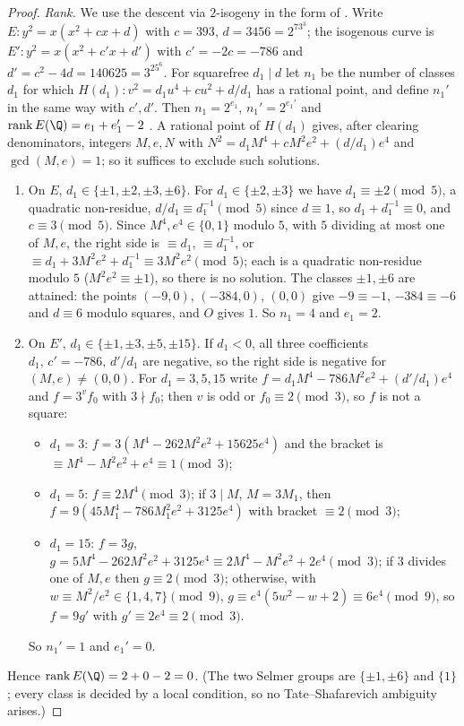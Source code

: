 \begin{proof}
\emph{Rank.} We use the descent via $2$-isogeny in the form of
\cite[\S3.6, Method~1 and (3.6.2)]{cremona1997}. Write $E:y^2=x(x^2+cx+d)$ with $c=393$,
$d=3456=2^73^3$; the isogenous curve is $E':y^2=x(x^2+c'x+d')$ with $c'=-2c=-786$ and
$d'=c^2-4d=140625=3^25^6$. For squarefree $d_1\mid d$ let $n_1$ be the number of classes $d_1$ for
which $H(d_1):v^2=d_1u^4+cu^2+d/d_1$ has a rational point, and define $n_1'$ in the same way with
$c',d'$. Then $n_1=2^{e_1}$, $n_1'=2^{e_1'}$ and $\operatorname{rank}E(\Q)=e_1+e_1'-2$
\cite[(3.6.2)]{cremona1997}. A rational point of $H(d_1)$ gives, after clearing denominators,
integers $M,e,N$ with $N^2=d_1M^4+cM^2e^2+(d/d_1)e^4$ and $\gcd(M,e)=1$; so it suffices to exclude
such solutions.
\begin{enumerate}[label=(\roman*)]
\item On $E$, $d_1\in\{\pm1,\pm2,\pm3,\pm6\}$. For $d_1\in\{\pm2,\pm3\}$ we have $d_1\equiv\pm2\pmod5$, a quadratic non-residue,
  $d/d_1\equiv d_1^{-1}\pmod5$ since $d\equiv1$, so $d_1+d_1^{-1}\equiv0$, and $c\equiv3\pmod5$. Since $M^4,e^4\in\{0,1\}$ modulo $5$,
  with $5$ dividing at most one of $M,e$, the right side is $\equiv d_1$, $\equiv d_1^{-1}$, or
  $\equiv d_1+3M^2e^2+d_1^{-1}\equiv3M^2e^2\pmod5$; each is a quadratic non-residue modulo $5$
  ($M^2e^2\equiv\pm1$), so there is no solution. The classes $\pm1,\pm6$ are attained:
  the points $(-9,0)$, $(-384,0)$, $(0,0)$ give $-9\equiv-1$, $-384\equiv-6$ and $d\equiv6$ modulo
  squares, and $O$ gives $1$. So $n_1=4$ and $e_1=2$.
\item On $E'$, $d_1\in\{\pm1,\pm3,\pm5,\pm15\}$. If $d_1<0$, all three coefficients
  $d_1,\,c'=-786,\,d'/d_1$ are negative, so the right side is negative for $(M,e)\ne(0,0)$. For
  $d_1=3,5,15$ write $f=d_1M^4-786M^2e^2+(d'/d_1)e^4$ and $f=3^vf_0$ with $3\nmid f_0$; then $v$ is odd
  or $f_0\equiv2\pmod3$, so $f$ is not a square:
  \begin{itemize}
  \item $d_1=3$: $f=3(M^4-262M^2e^2+15625e^4)$ and the bracket is $\equiv M^4-M^2e^2+e^4\equiv1\pmod3$;
  \item $d_1=5$: $f\equiv2M^4\pmod3$; if $3\mid M$, $M=3M_1$, then $f=9(45M_1^4-786M_1^2e^2+3125e^4)$ with
    bracket $\equiv2\pmod3$;
  \item $d_1=15$: $f=3g$, $g=5M^4-262M^2e^2+3125e^4\equiv2M^4-M^2e^2+2e^4\pmod3$; if $3$ divides one of
    $M,e$ then $g\equiv2\pmod3$; otherwise, with $w\equiv M^2/e^2\in\{1,4,7\}\pmod9$,
    $g\equiv e^4(5w^2-w+2)\equiv6e^4\pmod9$, so $f=9g'$ with $g'\equiv2e^4\equiv2\pmod3$.
  \end{itemize}
  So $n_1'=1$ and $e_1'=0$.
\end{enumerate}
Hence $\operatorname{rank}E(\Q)=2+0-2=0$. (The two Selmer groups are
$\{\pm1,\pm6\}$ and $\{1\}$; every class is decided by a local condition, so no
Tate--Shafarevich ambiguity arises.)


\end{proof}
